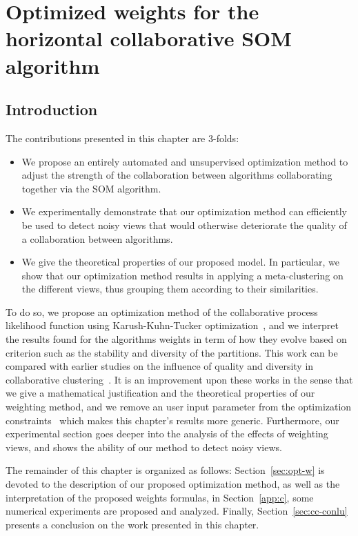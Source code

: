 
\chapter{Optimized weights for the horizontal collaborative SOM algorithm}

\minitoc{}
\newpage

\section{Introduction}

The contributions presented in this chapter are 3-folds:
\begin{itemize}
	\item We propose an entirely automated and unsupervised optimization method to adjust the strength of the collaboration between algorithms collaborating together via the SOM algorithm.
	\item We experimentally demonstrate that our optimization method can efficiently be used to detect noisy views that would otherwise deteriorate the quality of a collaboration between algorithms.
	\item We give the theoretical properties of our proposed model. In particular, we show that our optimization method results in applying a meta-clustering on the different views, thus grouping them according to their similarities. 
\end{itemize} 
To do so, we propose an optimization method of the collaborative process likelihood function using Karush-Kuhn-Tucker optimization~\cite{KKT1}, and we interpret the results found for the algorithms weights in term of how they evolve based on criterion such as the stability and diversity of the partitions. This work can be compared with earlier studies on the influence of quality and diversity in collaborative clustering~\cite{grozavu2011learning,DBLP:conf/ssci/RastinCGB15,DBLP:conf/ijcnn/GrozavuCB14,Sublime2017}. It is an improvement upon these works in the sense that we give a mathematical justification and the theoretical properties of our weighting method, and we remove an user input parameter from the optimization constraints~\cite{Sublime2017} which makes this chapter's results more generic. Furthermore, our experimental section goes deeper into the analysis of the effects of weighting views, and shows the ability of our method to detect noisy views.


The remainder of this chapter is organized as follows: Section~\ref{sec:opt-w} is devoted to the description of our proposed optimization method, as well as the interpretation of the proposed weights formulas, in Section~\ref{app:c}, some numerical experiments are proposed and analyzed. Finally, Section~\ref{sec:cc-conlu} presents a conclusion on the work presented in this chapter.

